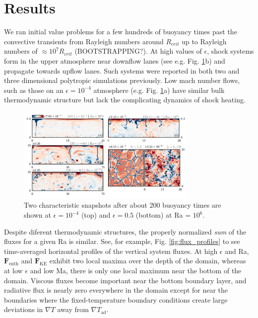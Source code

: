 \documentclass[aps, prl, twocolumn, groupedaddress]{revtex4-1}
\newcommand{\grad}{\ensuremath{\nabla}}
\begin{document}
\section{Results \label{section:results}}

We ran initial value problems for a few hundreds of buoyancy times past the convective transients from 
Rayleigh numbers around $R_{crit}$ up to Rayleigh numbers of $\approx 10^7 R_{crit}$ (BOOTSTRAPPING?).  At
high values of $\epsilon$, shock systems form in the upper atmosphere near downflow lanes 
(see e.g. Fig. \ref{fig:entropy_snapshots}b) and propagate towards upflow lanes.  Such systems were reported in
both two \cite{cattaneo&all1990} and three \cite{malagoli&all1990} dimensional polytropic simulations previously.
Low mach number flows, such as those on an $\epsilon = 10^{-4}$ atmosphere (e.g. Fig. \ref{fig:entropy_snapshots}a)
have similar bulk thermodynamic structure but lack the complicating dynamics of shock heating.

\begin{figure}[t]
\includegraphics[width=3.4375in]{./figs/snapshots_fig.png}
\caption{Two characteristic snapshots after about 200 buoyancy times are shown at $\epsilon=10^{-4}$ (top)
and $\epsilon=0.5$ (bottom) at Ra = $10^6$.  
\label{fig:entropy_snapshots} }
\end{figure}

Despite diferent thermodynamic structures, the properly normalized \emph{sum} of the fluxes for a given
Ra is similar.  See, for example, Fig. \ref{fig:flux_profiles} to see time-averaged horizontal profiles of
the vertical system fluxes.  At high $\epsilon$ and Ra, $\bm{F}_{\text{enth}}$ and $\bm{F}_{\text{KE}}$
exhibit two local maxima over the depth of the domain, whereas at low $\epsilon$ and low Ma, there is only
one local maximum near the bottom of the domain.  Viscous fluxes become important near the bottom boundary
layer, and radiative flux is nearly zero everywhere in the domain except for near the boundaries where the
fixed-temperature boundary conditions create large deviations in $\grad T$ away from $\grad T_{\text{ad}}$.
\end{document}
